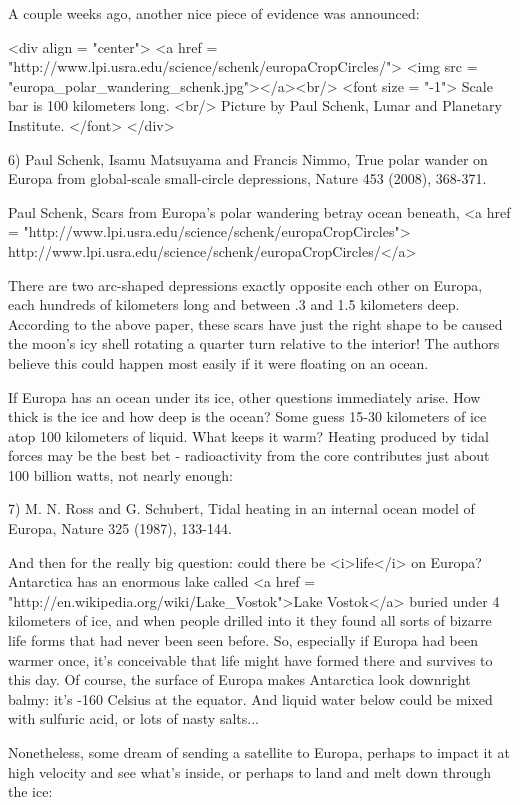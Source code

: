A couple weeks ago, another nice piece of evidence was announced:

<div align = "center">
<a href = "http://www.lpi.usra.edu/science/schenk/europaCropCircles/">
<img src = "europa_polar_wandering_schenk.jpg"></a><br/>
<font size = "-1"> 
Scale bar is 100 kilometers long.
<br/>
Picture by Paul Schenk, Lunar and Planetary Institute.
</font>
</div>

6) Paul Schenk, Isamu Matsuyama and Francis Nimmo, True polar wander 
on Europa from global-scale small-circle depressions, Nature 453 (2008),
368-371.

Paul Schenk, Scars from Europa's polar wandering betray ocean beneath, 
<a href = "http://www.lpi.usra.edu/science/schenk/europaCropCircles">
http://www.lpi.usra.edu/science/schenk/europaCropCircles/</a>

There are two arc-shaped depressions exactly opposite each other on
Europa, each hundreds of kilometers long and between .3 and 1.5 kilometers
deep.  According to the above paper, these scars have just the right shape 
to be caused the moon's icy shell rotating a quarter turn relative to
the interior!  The authors believe this could happen most easily if 
it were floating on an ocean.

If Europa has an ocean under its ice, other questions immediately arise.  
How thick is the ice and how deep is the ocean?  Some guess 15-30 kilometers
of ice atop 100 kilometers of liquid.  What keeps it warm?  Heating
produced by tidal forces may be the best bet - radioactivity from the core 
contributes just about 100 billion watts, not nearly enough:

7) M. N. Ross and G. Schubert, Tidal heating in an internal ocean model
of Europa, Nature 325 (1987), 133-144.

And then for the really big question: could there be <i>life</i> on Europa?
Antarctica has an enormous lake called <a href = "http://en.wikipedia.org/wiki/Lake_Vostok">Lake Vostok</a> buried under 4 kilometers 
of ice, and when people drilled into it they found all sorts of bizarre 
life forms that had never been seen before.  So, especially if Europa had
been warmer once, it's conceivable that life might have formed there and 
survives to this day.  Of course, the surface of Europa makes Antarctica 
look downright balmy: it's -160 Celsius at the equator.  And liquid water 
below could be mixed with sulfuric acid, or lots of nasty salts...

Nonetheless, some dream of sending a satellite to Europa, perhaps 
to impact it at high velocity and see what's inside, or perhaps to land
and melt down through the ice:

